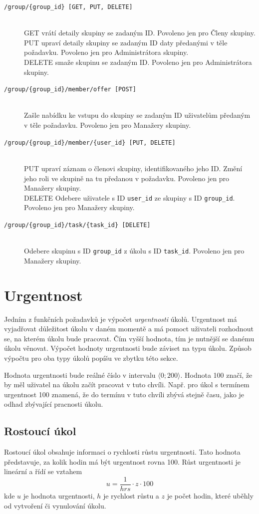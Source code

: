 \documentclass[thesis=B,czech]{FITthesis}[2012/06/26]
\newcommand{\foradmin}{Povoleno jen pro Administrátora skupiny.}
\newcommand{\formanagers}{Povoleno jen pro Manažery skupiny.}
\newcommand{\formembers}{Povoleno jen pro Členy skupiny.}
\begin{document}
\begin{description}
			\item[\texttt{/group/\{group\_id\} [GET, PUT, DELETE]}] \hfill \\
				GET vrátí detaily skupiny se zadaným ID. \formembers \\
				PUT upraví detaily skupiny se zadaným ID daty předanými v těle požadavku. \foradmin \\
				DELETE smaže skupinu se zadaným ID. \foradmin 

			\item[\texttt{/group/\{group\_id\}/member/offer [POST]}] \hfill \\
				Zašle nabídku ke vstupu do skupiny se zadaným ID uživatelům předaným v těle požadavku. \formanagers

			\item[\texttt{/group/\{group\_id\}/member/\{user\_id\} [PUT, DELETE]}] \hfill \\
				PUT upraví záznam o členovi skupiny, identifikovaného jeho ID. Změní jeho roli ve skupině na tu předanou v požadavku. \formanagers \\
				DELETE Odebere uživatele s ID \texttt{user\_id} ze skupiny s ID \texttt{group\_id}. \formanagers
			
			\item[\texttt{/group/\{group\_id\}/task/\{task\_id\} [DELETE]}] \hfill \\
				Odebere skupinu s ID \texttt{group\_id} z úkolu s ID \texttt{task\_id}. \formanagers
		

			\end{description}
			
			
	\section{Urgentnost}
		Jedním z funkčních požadavků je výpočet \textit{urgentnosti} úkolů. Urgentnost má vyjadřovat důležitost úkolu v daném momentě a má pomoct uživateli rozhodnout se, na kterém úkolu bude pracovat. Čím vyšší hodnota, tím je nutnější se danému úkolu věnovat. Výpočet hodnoty urgentnosti bude záviset na typu úkolu. Způsob výpočtu pro oba typy úkolů popíšu ve zbytku této sekce.
		
		Hodnota urgentnosti bude reálné číslo v intervalu $\langle 0; 200 \rangle$. Hodnota 100 značí, že by měl uživatel na úkolu začít pracovat v tuto chvíli. Např. pro úkol s termínem urgentnost 100 znamená, že do termínu v tuto chvíli zbývá stejně času, jako je odhad zbývající pracnosti úkolu.
	
		\subsection{Rostoucí úkol}
			Rostoucí úkol obsahuje informaci o rychlosti růstu urgentnosti. Tato hodnota představuje, za kolik hodin má být urgentnost rovna 100. Růst urgentnosti je lineární a řídí se vztahem
			$$
				u = \frac{1}{hrs} \cdot z \cdot 100
			$$
			kde $u$ je hodnota urgentnosti, $h$ je rychlost růstu a $z$ je počet hodin, které uběhly od vytvoření či vynulování úkolu.
		
\end{document}
